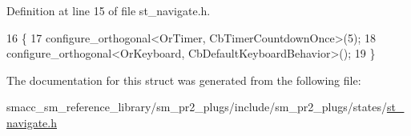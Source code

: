 Definition at line 15 of file st\+\_\+navigate.\+h.


\begin{DoxyCode}
16     \{
17         configure\_orthogonal<OrTimer,  CbTimerCountdownOnce>(5);    
18         configure\_orthogonal<OrKeyboard, CbDefaultKeyboardBehavior>();
19     \}
\end{DoxyCode}


The documentation for this struct was generated from the following file\+:\begin{DoxyCompactItemize}
\item 
smacc\+\_\+sm\+\_\+reference\+\_\+library/sm\+\_\+pr2\+\_\+plugs/include/sm\+\_\+pr2\+\_\+plugs/states/\hyperlink{st__navigate_8h}{st\+\_\+navigate.\+h}\end{DoxyCompactItemize}
